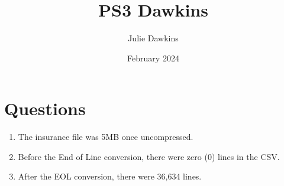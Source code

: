 \documentclass{article}
\title{PS3 Dawkins}
\author{Julie Dawkins}
\date{February 2024}
\begin{document}
\maketitle

\section*{Questions}
\begin{enumerate}
    \item The insurance file was 5MB once uncompressed. 
    \item Before the End of Line conversion, there were zero (0) lines in the CSV. 
    \item After the EOL conversion, there were 36,634 lines.
\end{enumerate}
\end{document}
